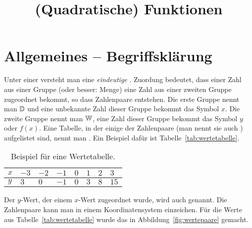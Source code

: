 \documentclass[loadfonts,babel=ngerman]{arbeitsblatt}
\title{(Quadratische) Funktionen}
\begin{document}
\maketitle

\section{Allgemeines -- Begriffsklärung}

Unter einer  versteht man eine \emph{eindeutige}
.  Zuordung bedeutet, dass einer Zahl aus einer Gruppe
(oder besser: Menge) eine Zahl aus einer zweiten Gruppe zugeordnet bekommt, so
dass Zahlenpaare entstehen.  Die erste Gruppe nennt man
 $\mathbb{D}$ und eine unbekannte Zahl dieser
Gruppe bekommt das Symbol $x$.  Die zweite Gruppe nennt man
 $\mathbb{W}$, eine Zahl dieser Gruppe bekommt das Symbol
$y$ oder $f(x)$.  Eine Tabelle, in der einige der Zahlenpaare (man nennt sie
auch ) aufgelistet sind, nennt man .  Ein
Beispiel dafür ist Tabelle~\vref{tab:wertetabelle}.

\begin{table}
  \centering
  \caption{Beispiel für eine Wertetabelle.}
  \label{tab:wertetabelle}
\end{table}

Der $y$-Wert, der einem $x$-Wert zugeordnet wurde, wird auch
 genannt.  Die Zahlenpaare kann man in einem
Koordinatensystem einzeichen.  Für die Werte aus
Tabelle~\vref{tab:wertetabelle} wurde das in Abbildung~\vref{fig:wertepaare}
gemacht.
\end{document}
